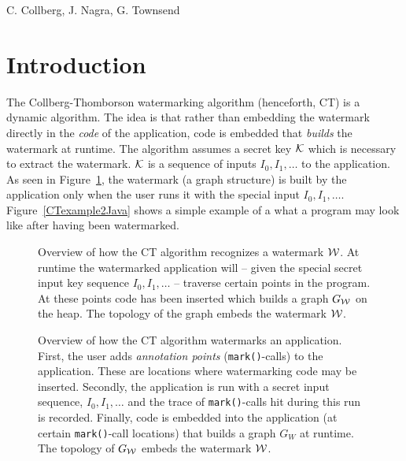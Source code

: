 %
          {C. Collberg, J. Nagra, G. Townsend}


\section{Introduction}
The Collberg-Thomborson watermarking algorithm (henceforth,
{\sf CT}) is a dynamic algorithm. The idea is that rather
than embedding the watermark directly in the {\em code} of 
the application, code is embedded that {\em builds} the watermark 
at runtime. The algorithm assumes a secret key $\cal K$ which 
is necessary to extract the watermark. $\cal K$ is a sequence of inputs 
$I_0,I_1,\ldots$ to the application. As seen in Figure~\ref{CToverview},
the watermark (a graph structure) is built by the application
only when the user runs it with the special input $I_0,I_1,\ldots$.
Figure~\ref{CTexample2Java} shows a simple example of a what
a program may look like after having been watermarked.

\begin{figure}
\begin{center}

\end{center}
\caption{Overview of how the {\sf CT} algorithm recognizes
         a watermark $\cal W$. At runtime the watermarked 
         application will -- given the special secret input 
         key sequence $I_0,I_1,\ldots$ -- traverse certain 
         points in the program. At these points code has 
         been inserted which builds a graph $G_{\cal W}$ 
         on the heap. The topology of the graph embeds 
         the watermark $\cal W$.}
\label{CToverview}
\end{figure}

\begin{figure}
\begin{center}

\end{center}
\caption{Overview of how the {\sf CT} algorithm watermarks an
         application. First, the user adds {\em annotation points}
         ({\tt mark()}-calls) to the application. These are locations
         where watermarking code may be inserted. Secondly, the
         application is run with a secret input sequence,
         $I_0,I_1,\ldots$ and the trace of {\tt mark()}-calls
         hit during this run is recorded. Finally, code is 
         embedded into the application (at certain {\tt mark()}-call
         locations) that builds a graph $G_W$ at runtime. The
         topology of $G_{\cal W}$ embeds the watermark $\cal W$.}
\label{CTalgorithm}
\end{figure}

